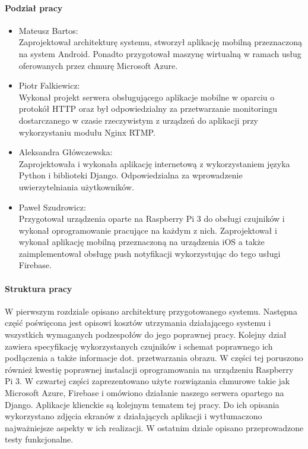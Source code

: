\paragraph{Podział pracy}
\begin{itemize}
\item Mateusz Bartos: \\
Zaprojektował architekturę systemu, stworzył aplikację mobilną przeznaczoną na system Android. Ponadto przygotował maszynę wirtualną w ramach usług oferowanych przez chmurę Microsoft Azure.
\item Piotr Falkiewicz: \\
Wykonał projekt serwera obsługującego aplikacje mobilne w oparciu o protokół HTTP oraz był odpowiedzialny za przetwarzanie monitoringu dostarczanego w czasie rzeczywistym z urządzeń do aplikacji przy wykorzystaniu modułu Nginx RTMP.
\item Aleksandra Główczewska: \\
Zaprojektowała i wykonała aplikację internetową z wykorzystaniem języka Python i biblioteki Django. Odpowiedzialna za wprowadzenie uwierzytelniania użytkowników.
\item Paweł Szudrowicz: \\
Przygotował urządzenia oparte na Raspberry Pi 3 do obsługi czujników i wykonał oprogramowanie pracujące na każdym z nich. Zaprojektował i wykonał aplikację mobilną przeznaczoną na urządzenia iOS a także zaimplementował obsługę push notyfikacji wykorzystując do tego usługi Firebase.
\end{itemize}

\paragraph{Struktura pracy}
W pierwszym rozdziale opisano architekturę przygotowanego systemu. Następna część poświęcona jest opisowi kosztów utrzymania działającego systemu i wszystkich wymaganych podzespołów do jego poprawnej pracy. Kolejny dział zawiera specyfikację wykorzystanych czujników i schemat poprawnego ich podłączenia a także informacje dot. przetwarzania obrazu. W części tej poruszono również kwestię poprawnej instalacji oprogramowania na urządzeniu Raspberry Pi 3.  W czwartej części zaprezentowano użyte rozwiązania chmurowe takie jak Microsoft Azure, Firebase i omówiono działanie naszego serwera opartego na Django. Aplikacje klienckie są kolejnym tematem tej pracy. Do ich opisania wykorzystano zdjęcia ekranów z działających aplikacji i wytłumaczono najważniejsze aspekty w ich realizacji. W ostatnim dziale opisano przeprowadzone testy funkcjonalne.
